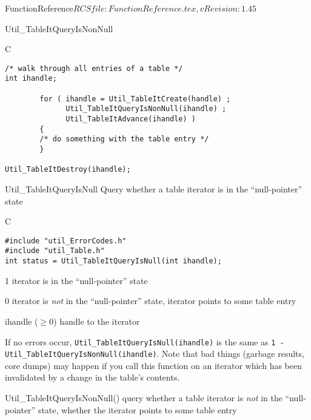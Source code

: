 \begin{cactuspart}{5}{FunctionReference}{$RCSfile: FunctionReference.tex,v $}{$Revision: 1.45 $}
\begin{FunctionDescription}{Util\_TableItQueryIsNonNull}
\begin{Example}{C}
\begin{verbatim}
/* walk through all entries of a table */
int ihandle;

        for ( ihandle = Util_TableItCreate(handle) ;
              Util_TableItQueryIsNonNull(ihandle) ;
              Util_TableItAdvance(ihandle) )
        {
        /* do something with the table entry */
        }

Util_TableItDestroy(ihandle);
\end{verbatim}
\end{Example}
\end{FunctionDescription}


\begin{FunctionDescription}{Util\_TableItQueryIsNull}
\label{Util-TableItQueryIsNull}
Query whether a table iterator is in the ``null-pointer'' state

\begin{Synopsis}{C}
\begin{verbatim}
#include "util_ErrorCodes.h"
#include "util_Table.h"
int status = Util_TableItQueryIsNull(int ihandle);
\end{verbatim}
\end{Synopsis}

\begin{Result}{\rm 1}
iterator is in the ``null-pointer'' state
\end{Result}
\begin{Result}{\rm 0}
iterator is {\em not\/} in the ``null-pointer'' state,
\ie{} iterator points to some table entry
\end{Result}

\begin{Parameter}{ihandle ($\ge 0$)}
handle to the iterator
\end{Parameter}

\begin{Discussion}
If no errors occur,
\verb|Util_TableItQueryIsNull(ihandle)|
is the same as
\verb|1 - Util_TableItQueryIsNonNull(ihandle)|.
\NewPar
Note that bad things (garbage results, core dumps) may happen if
you call this function on an iterator which has been invalidated
by a change in the table's contents.
\end{Discussion}

\begin{SeeAlso}{Util\_TableItQueryIsNonNull()}
query whether a table iterator is {\em not\/} in the ``null-pointer'' state,
\ie{} whether the iterator points to some table entry
\end{SeeAlso}


\end{FunctionDescription}
\end{cactuspart}
